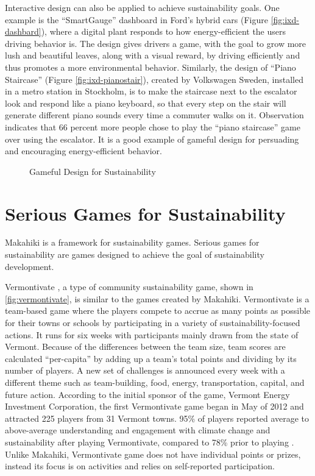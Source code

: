 Interactive design can also be applied to achieve sustainability goals. One example is the ``SmartGauge'' dashboard in Ford's hybrid cars\cite {ideo2009} (Figure \autoref{fig:ixd-dashbard}), where a digital plant responds to how energy-efficient the users driving behavior is. The design gives drivers a game, with the goal to grow more lush and beautiful leaves, along with a visual reward, by driving efficiently and thus promotes a more environmental behavior. Similarly, the design of ``Piano Staircase'' \cite {funtheory2009} (Figure \autoref{fig:ixd-pianostair}), created by Volkswagen Sweden, installed in a metro station in Stockholm, is to make the staircase next to the escalator look and respond like a piano keyboard, so that every step on the stair will generate different piano sounds every time a commuter walks on it. Observation indicates that 66 percent more people chose to play the ``piano staircase'' game over using the escalator. It is a good example of gameful design for persuading and encouraging energy-efficient behavior. 

 \begin{figure}[ht!]
	\centering
		\caption{Gameful Design for Sustainability}
		\label{fig:ixd}
\end{figure}	

\section{Serious Games for Sustainability}
\label{sec:rel-sg-sustainability}

Makahiki is a framework for sustainability games. Serious games for sustainability are games designed to achieve the goal of sustainability development.    

Vermontivate \cite{vermontivate}, a type of community sustainability game, shown in \autoref{fig:vermontivate}, is similar to the games created by Makahiki.  Vermontivate is a team-based game where  the players compete to accrue as many points as possible for their towns or schools by participating in a variety of sustainability-focused actions. It runs for six weeks with  participants mainly drawn from the state of Vermont. Because of the differences between the team size, team scores are calculated ``per-capita'' by adding up a team's total points and dividing by its number of players. A new set of challenges is announced every week with a different theme such as team-building, food, energy, transportation, capital, and future action. According to the initial sponsor of the game, Vermont Energy Investment Corporation, the first Vermontivate game began in May of 2012 and attracted 225 players from 31 Vermont towns. 95\% of players reported average to above-average understanding and engagement with climate change and sustainability after playing Vermontivate, compared to 78\% prior to playing \cite{veic}. Unlike Makahiki, Vermontivate game does not have individual points or prizes, instead its focus is on activities and relies on self-reported participation. 

